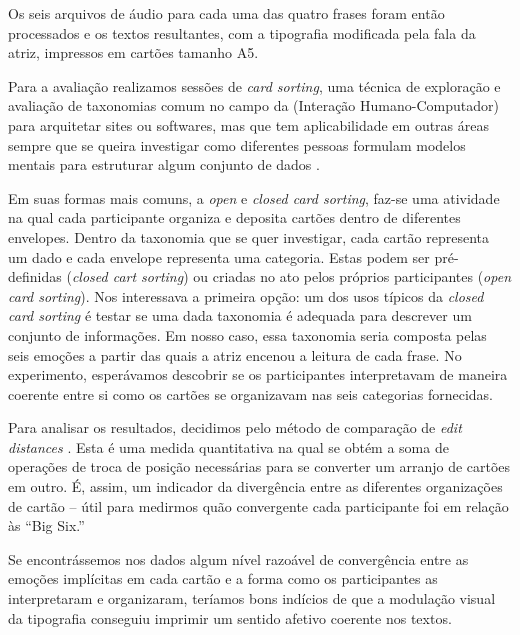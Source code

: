 \documentclass[a4paper]{tufte-handout}
\newcommand{\textls}[2][5]{%
    \begingroup\addfontfeatures{LetterSpace=#1}#2\endgroup
  }
\renewcommand{\smallcapsspacing}[1]{\textls[10]{#1}}
\renewcommand{\textsc}[1]{\smallcapsspacing{\textsmallcaps{#1}}}
\begin{document}
Os seis arquivos de áudio para cada uma das quatro frases foram então processados e os textos resultantes, com a tipografia modificada pela fala da atriz, impressos em cartões tamanho A5.

Para a avaliação realizamos sessões de \textit{card sorting}, uma técnica de exploração e avaliação de taxonomias comum no campo da \textsc{ihc} (Interação Humano-Computador) para arquitetar sites ou softwares, mas que tem aplicabilidade em outras áreas sempre que se queira investigar como diferentes pessoas formulam modelos mentais para estruturar algum conjunto de dados \citep{about_cardsorting}.


Em suas formas mais comuns, a \textit{open} e \textit{closed card sorting}, faz-se uma atividade na qual cada participante organiza e deposita cartões dentro de diferentes envelopes. Dentro da taxonomia que se quer investigar, cada cartão representa um dado e cada envelope representa uma categoria. Estas podem ser pré-definidas (\textit{closed cart sorting}) ou criadas no ato pelos próprios participantes (\textit{open card sorting}). Nos interessava a primeira opção: um dos usos típicos da \textit{closed card sorting} é testar se uma dada taxonomia é adequada para descrever um conjunto de informações. Em nosso caso, essa taxonomia seria composta pelas seis emoções a partir das quais a atriz encenou a leitura de cada frase. No experimento, esperávamos descobrir se os participantes interpretavam de maneira coerente entre si como os cartões se organizavam nas seis categorias fornecidas.

Para analisar os resultados, decidimos pelo método de comparação de \textit{edit distances} \citep{nawaz2012}. Esta é uma medida quantitativa na qual se obtém a soma de operações de troca de posição necessárias para se converter um arranjo de cartões em outro. É, assim, um indicador da divergência entre as diferentes organizações de cartão -- útil para medirmos quão convergente cada participante foi em relação às ``Big Six.''

Se encontrássemos nos dados algum nível razoável de convergência entre as emoções implícitas em cada cartão e a forma como os participantes as interpretaram e organizaram, teríamos bons indícios de que a modulação visual da tipografia conseguiu imprimir um sentido afetivo coerente nos textos.
\end{document}
